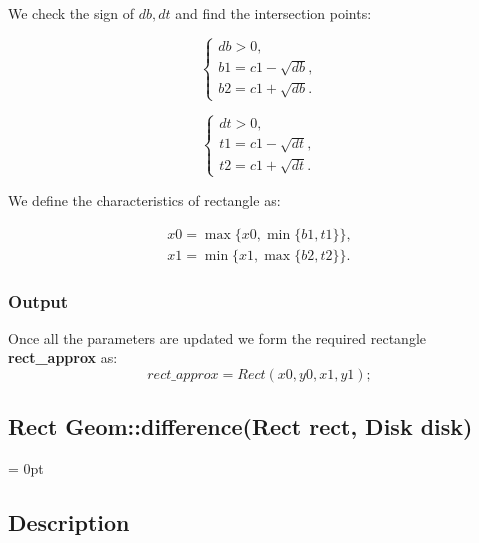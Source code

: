 \documentclass{report}
\begin{document}
\begin{itemize}
\begin{itemize}
		We check the sign of $db, dt$ and find the intersection points:
			
		\begin{equation}
			\begin{cases}
				db > 0,\\ 
				b1 = c1 - \sqrt {db},\\
				b2 = c1 + \sqrt {db}.
				\label{eq:b1b2}
			\end{cases}
		\end{equation}
		
		\begin{equation}
			\begin{cases}
				dt > 0,\\ 
				t1 = c1 - \sqrt {dt},\\
				t2 = c1 + \sqrt {dt}.
				\label{eq:t1t2}
			\end{cases}
		\end{equation}
			
		We define the characteristics of rectangle as:
		
			\begin{equation}
				\begin{gathered}
					x0 = \max\{x0, \min\{b1, t1\}\},\\
					x1 = \min\{x1, \max\{b2, t2\}\}.
			\end{gathered}
		\end{equation}
	
		\end{itemize}	
	\end{itemize}

	\subsubsection*{Output}

Once all the parameters are updated we form the required rectangle {\bfseries rect\_approx} as:
\begin{equation}
	rect\_approx = Rect(x0, y0, x1, y1);
	\label{rect}
\end{equation}
\newpage
	
\begin{center} 
	\section*{Rect Geom::difference(Rect rect, Disk disk)}
\end{center}
\parindent = 0pt
\subsection*{Description}
\end{document}
